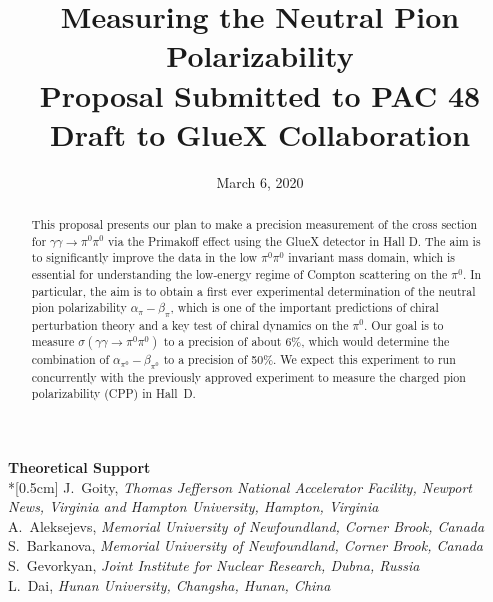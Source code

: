 \documentclass[letterpaper,12pt]{article}
\date{March 6, 2020}
\title{\Large \textbf{Measuring the Neutral Pion Polarizability}\\
\large{Proposal Submitted to PAC 48} \\
\large{ Draft to GlueX Collaboration}
}
\begin{document}
\setlength{\parindent}{2em}


\maketitle

\thispagestyle{empty}

\vspace{3cm}
{\large\textbf {Theoretical Support}} \\*[0.5cm]
\small{J.~Goity, \textit{Thomas Jefferson National Accelerator Facility, Newport News, Virginia and Hampton University, Hampton, Virginia}\\
A.~Aleksejevs,  \textit{Memorial University of Newfoundland, Corner Brook, Canada}\\
S.~Barkanova,  \textit{Memorial University of Newfoundland, Corner Brook, Canada}\\
S.~Gevorkyan,  \textit{Joint Institute for Nuclear Research, Dubna, Russia}\\
L.~Dai,  \textit{Hunan University, Changsha, Hunan, China}
}



\begin{abstract}
This proposal presents our plan to make a precision measurement of the
cross section for $\gamma \gamma \rightarrow \pi^0 \pi^0$ via the
Primakoff effect using the GlueX detector in Hall D. The aim is to
significantly improve the data in the low $\pi^0\pi^0$ invariant mass
domain, which is essential for understanding the low-energy regime of
Compton scattering on the $\pi^0$. In particular, the aim is to obtain
a first ever experimental determination of the neutral pion
polarizability $\alpha_\pi - \beta_\pi$, which is one of the important
predictions of chiral perturbation theory and a key test of chiral
dynamics on the $\pi^0$.  Our goal is to measure
$\sigma(\gamma\gamma\rightarrow\pi^0\pi^0)$ to a precision of about
6\%, which would determine the combination of
$\alpha_{\pi^0}-\beta_{\pi^0}$ to a precision of 50\%. We expect this
experiment to run concurrently with the previously approved experiment
to measure the charged pion polarizability (CPP) \cite{CPPexp} in
Hall~D.
\end{abstract}
\end{document}
